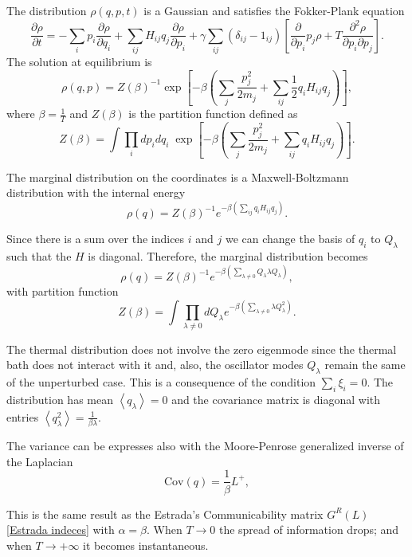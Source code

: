 The distribution $\rho(q,p,t)$ is a Gaussian and satisfies the Fokker-Plank equation \cite{Fokker}
\begin{equation}
    \frac{\partial\rho}{\partial t} = -\sum_i p_i\frac{\partial \rho}{\partial q_i} + \sum_{ij} H_{ij}q_j\frac{\partial \rho}{\partial p_i} + \gamma\sum_{ij}\left(\delta_{ij}-1_{ij}\right)\left[\frac{\partial}{\partial p_i}p_j\rho + T \frac{\partial^2\rho}{\partial p_i \partial p_j}\right].
\end{equation}
The solution at equilibrium is
\begin{equation}
    \rho(q,p) = Z(\beta)^{-1} \exp\left[ -\beta \left( \sum_j \frac{p_j^2}{2m_j} + \sum_{ij} \frac{1}{2}q_iH_{ij}q_j\right)\right],
\end{equation}
where $\beta = \frac{1}{T}$ and $Z(\beta)$ is the partition function defined as
\begin{equation}
    Z(\beta) = \int \prod_i dp_i dq_i \; \exp\left[ -\beta \left( \sum_j \frac{p_j^2}{2m_j} + \sum_{ij} q_iH_{ij}q_j\right)\right].
\end{equation}

The marginal distribution on the coordinates is a Maxwell-Boltzmann distribution with the internal energy 
\begin{equation}
    \rho(q) = Z(\beta)^{-1} e^{-\beta \left(\sum_{ij} q_iH_{ij}q_j\right)}.
\end{equation}

Since there is a sum over the indices $i$ and $j$ we can change the basis of $q_i$ to $Q_\lambda$ such that the $H$ is diagonal. Therefore, the marginal distribution becomes
\begin{equation}\label{marginal_probability}
    \rho(q) = Z(\beta)^{-1} e^{-\beta \left(\sum_{\lambda \neq 0} Q_\lambda \lambda Q_\lambda\right)},
\end{equation}
with partition function 
\begin{equation}
    Z(\beta) = \int \prod_{\lambda\neq 0} dQ_\lambda e^{-\beta \left(\sum_{\lambda \neq 0} \lambda Q_\lambda^2\right)}.
\end{equation}

The thermal distribution does not involve the zero eigenmode since the thermal bath does not interact with it and, also, the oscillator modes $Q_\lambda$ remain the same of the unperturbed case. 
This is a consequence of the condition $\sum_i \xi_i = 0$.
The distribution has mean $\left<q_\lambda\right>= 0$ and the covariance matrix is diagonal with entries $\left<q^2_\lambda\right>= \frac{1}{\beta \lambda}$.

The variance can be expresses also with the Moore-Penrose generalized inverse of the Laplacian
\begin{equation}
    \mathrm{Cov}(q) = \frac{1}{\beta}L^+,
\end{equation}

This is the same result as the Estrada's Communicability matrix $G^R(L)$ \eqref{Estrada indeces} with $\alpha=\beta$.
When $T\rightarrow 0$ the spread of information drops; and when $T\rightarrow +\infty$ it becomes instantaneous.